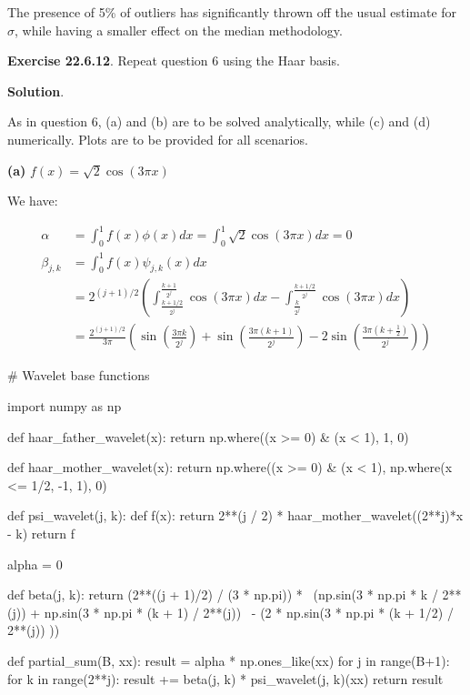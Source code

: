 The presence of 5\% of outliers has significantly thrown off the usual
estimate for \(\sigma\), while having a smaller effect on the median
methodology.

\textbf{Exercise 22.6.12}. Repeat question 6 using the Haar basis.

\textbf{Solution}.

As in question 6, (a) and (b) are to be solved analytically, while (c)
and (d) numerically. Plots are to be provided for all scenarios.

\textbf{(a)} \(f(x) = \sqrt{2} \cos (3 \pi x)\)

We have:

\[
\begin{align}
\alpha &= \int_0^1 f(x) \phi(x) dx = \int_0^1 \sqrt{2} \cos (3 \pi x) dx = 0 \\
\beta_{j, k} &= \int_0^1 f(x) \psi_{j, k}(x) dx \\
&= 2^{(j + 1)/2} \left( \int_{\frac{k + 1/2}{2^j}}^{\frac{k + 1}{2^j}} \cos(3 \pi x) dx - \int_{\frac{k}{2^j}}^{\frac{k + 1/2}{2^j}} \cos(3 \pi x) dx \right) \\
&= \frac{2^{(j + 1)/2}}{3 \pi} \left(
 \sin\left( \frac{3\pi k}{2^j} \right)
 + \sin\left( \frac{3\pi (k + 1)}{2^j} \right)
 -  2 \sin\left( \frac{3\pi \left(k + \frac{1}{2}\right)}{2^j} \right) 
\right)
\end{align}
\]

\begin{python}
# Wavelet base functions

import numpy as np

def haar_father_wavelet(x):
    return np.where((x >= 0) & (x < 1), 1, 0)

def haar_mother_wavelet(x):
    return np.where((x >= 0) & (x < 1), np.where(x <= 1/2, -1, 1), 0)

def psi_wavelet(j, k):
    def f(x):
        return 2**(j / 2) * haar_mother_wavelet((2**j)*x - k)
    return f
\end{python}

\begin{python}
alpha = 0

def beta(j, k):
    return (2**((j + 1)/2) / (3 * np.pi)) *  \
            (np.sin(3 * np.pi * k / 2**(j)) + np.sin(3 * np.pi * (k + 1) / 2**(j)) \
             - (2 * np.sin(3 * np.pi * (k + 1/2) / 2**(j)) ))

def partial_sum(B, xx):
    result = alpha * np.ones_like(xx)
    for j in range(B+1):
        for k in range(2**j):
            result += beta(j, k) * psi_wavelet(j, k)(xx)
    return result
\end{python}

